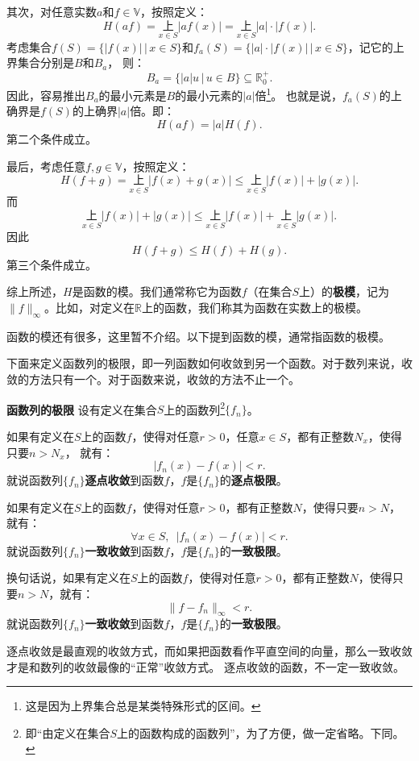 \documentclass[12pt,UTF8,fontset=none]{ctexbook}
\begin{document}
\begin{appendix}
其次，对任意实数$a$和$f\in\mathbb{V}$，按照定义：
$$ H(af) = \underset{x\in S}{\text{上}} |af(x)| = \underset{x\in S}{\text{上}} |a|\cdot |f(x)|. $$
考虑集合$f(S) = \{ |f(x)| \, | \, x\in S\}$和$f_a(S) = \{|a|\cdot |f(x)| \, | \, x\in S\}$，记它的上界集合分别是$B$和$B_a$，
则：
$$ B_a = \{|a| u \, | \, u \in B\} \subseteq \mathbb{R}_0^+. $$
因此，容易推出$B_a$的最小元素是$B$的最小元素的$|a|$倍\footnote{这是因为上界集合总是某类特殊形式的区间。}。
也就是说，$f_a(S)$的上确界是$f(S)$的上确界$|a|$倍。即：
$$ H(af) = |a| H(f). $$
第二个条件成立。

最后，考虑任意$f,g \in \mathbb{V}$，按照定义：
$$ H(f + g) = \underset{x\in S}{\text{上}} |f(x) + g(x)| \leqslant \underset{x\in S}{\text{上}} |f(x)| + |g(x)|. $$
而
$$ \underset{x\in S}{\text{上}} |f(x)| + |g(x)| \leqslant \underset{x\in S}{\text{上}} |f(x)| + \underset{x\in S}{\text{上}}|g(x)|.$$
因此
$$ H(f + g) \leqslant H(f) + H(g).$$
第三个条件成立。

综上所述，$H$是函数的模。我们通常称它为函数$f$（在集合$S$上）的\textbf{极模}，记为$\|f\|_{\infty}$。比如，对定义在$\mathbb{R}$上的函数，我们称其为函数在实数上的极模。

函数的模还有很多，这里暂不介绍。以下提到函数的模，通常指函数的极模。

下面来定义函数列的极限，即一列函数如何收敛到另一个函数。对于数列来说，收敛的方法只有一个。对于函数来说，收敛的方法不止一个。

\begin{df}{\textbf{函数列的极限}}
    设有定义在集合$S$上的函数列\footnote{即“由定义在集合$S$上的函数构成的函数列”，为了方便，做一定省略。下同。}$\{f_n\}$。
    
    如果有定义在$S$上的函数$f$，使得对任意$r>0$，任意$x\in S$，都有正整数$N_x$，使得只要$n>N_x$，
    就有：
    $$ |f_n(x) - f(x) | < r.$$
    就说函数列$\{f_n\}$\textbf{逐点收敛}到函数$f$，$f$是$\{f_n\}$的\textbf{逐点极限}。

    如果有定义在$S$上的函数$f$，使得对任意$r>0$，都有正整数$N$，使得只要$n>N$，
    就有：
    $$ \forall x\in S, \,\,\,|f_n(x) - f(x) | < r.$$
    就说函数列$\{f_n\}$\textbf{一致收敛}到函数$f$，$f$是$\{f_n\}$的\textbf{一致极限}。

    换句话说，如果有定义在$S$上的函数$f$，使得对任意$r>0$，都有正整数$N$，使得只要$n>N$，就有：
    $$ \| f - f_n \|_{\infty} < r.$$
    就说函数列$\{f_n\}$\textbf{一致收敛}到函数$f$，$f$是$\{f_n\}$的\textbf{一致极限}。
\end{df}

逐点收敛是最直观的收敛方式，而如果把函数看作平直空间的向量，那么一致收敛才是和数列的收敛最像的“正常”收敛方式。
逐点收敛的函数，不一定一致收敛。


\end{appendix}
\end{document}
